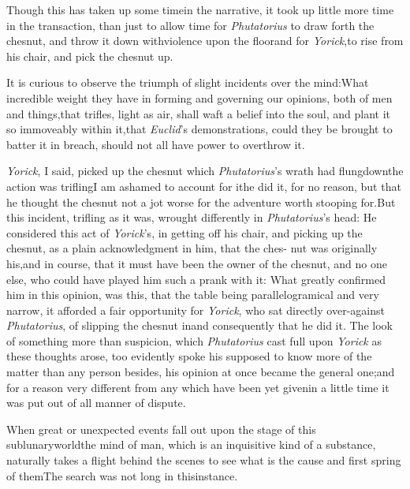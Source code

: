 \documentclass{article}
\begin{document}
Though this has taken up some time\break in the narrative, it took up
little more time in the transaction, than just to allow time for
\textit{Phutatorius} to draw forth the chesnut, and throw it down
with\break violence upon the floor\tsk and for
\textit{Yorick},\break to rise
from his chair, and pick the chesnut up.

It is curious to observe the triumph of slight incidents over
the mind:\tsh What incredible weight they have in forming
and governing our opinions, both of men and things,\tsk that
trifles, light as air, shall waft a belief into the soul,
and plant it so immoveably within it,\tsk that
\textit{Euclid}’s demonstrations, could they be brought to
batter it in breach, should not all have power to overthrow
it.

\textit{Yorick}, I said, picked up the chesnut which
\textit{Phutatorius}’s wrath had flung\break down\tsk the action
was trifling\tsk I am ashamed to account for it\tsk he did
it,\break
for no reason, but that he thought the chesnut not a jot
worse for the adventure\tsk {}
worth stooping for.\tsk But this incident, trifling as it
was, wrought differently in \textit{Phutatorius}’s head: He
considered this act of \textit{Yorick}’s, in getting off his
chair, and picking up the chesnut, as a plain acknowledgment
in him, that the ches- nut was originally his,\tsk and in
course, that it must have been the owner of the chesnut, and
no one else, who could have played him such a prank with it:\break
What greatly confirmed him in this opinion, was this, that
the table being pa\-rallelogramical and very narrow, it
afforded a fair opportunity for \textit{Yorick},\break
who sat directly over-against \textit{Phutatorius},\break
of slipping the chesnut in\tsk and consequently that he did it. The look of
something more than suspicion, which \textit{Phutatorius}
cast full upon \textit{Yorick} as these thoughts arose, too
evidently spoke his 
supposed to know more of the matter than any
person besides, his opinion at once became the general
one;\tsh and for a reason very different from any which have
been yet given\tsh\enlargethispage\baselineskip in a little time it was put out of all
manner of dispute.

When great or unexpected events fall out upon the stage of this
sublunary\break world\tsk the mind of man, which is an
inquisitive kind of a substance, naturally takes a flight behind
the scenes to see what is the cause and first spring
of\break
them\tsk The search was not long in this\break instance.
\end{document}
